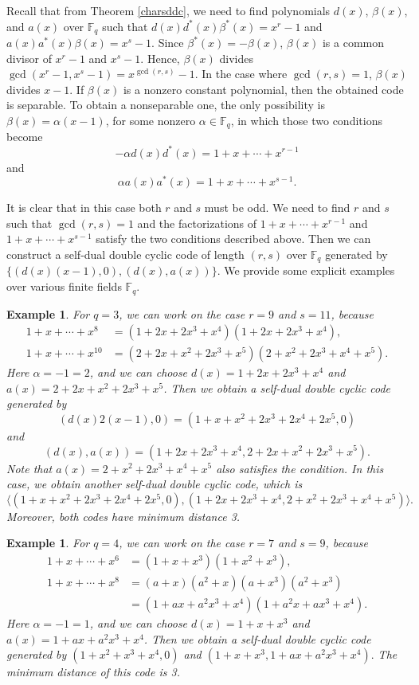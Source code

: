 \documentclass[12pt]{article}
\newtheorem{example}[theorem]{Example}
\begin{document}
	Recall that from Theorem \ref{charsddc}, we need to find polynomials $d(x)$, $\beta(x)$, and $a(x)$ over $\mathbb{F}_q$ such that $d(x)d^{*}(x)\beta^{*}(x)=x^r-1$ and $a(x)a^{*}(x)\beta(x)=x^s-1$. Since $\beta^{*}(x)=-\beta(x)$, $\beta(x)$ is a common divisor of $x^r-1$ and $x^s-1$. Hence, $\beta(x)$ divides $\gcd(x^r-1,x^s-1)=x^{\gcd(r,s)}-1$. In the case where $\gcd(r,s)=1$, $\beta(x)$ divides $x-1$. If $\beta(x)$ is a nonzero constant polynomial, then the obtained code is separable. To obtain a nonseparable one, the only possibility is $\beta(x)=\alpha(x-1)$, for some nonzero $\alpha\in\mathbb{F}_q$, in which those two conditions become
	$$-\alpha d(x)d^{*}(x)=1+x+\cdots+x^{r-1}$$
	and $$\alpha a(x)a^{*}(x)=1+x+\cdots+x^{s-1}.$$
	
	It is clear that in this case both $r$ and $s$ must be odd. We need to find $r$ and $s$ such that $\gcd(r,s)=1$ and the factorizations of $1+x+\cdots+x^{r-1}$ and $1+x+\cdots+x^{s-1}$ satisfy the two conditions described above. Then we can construct a self-dual double cyclic code of length $(r,s)$ over $\mathbb{F}_q$ generated by $\{(d(x)(x-1),0),(d(x),a(x))\}$. We provide some explicit examples over various finite fields $\mathbb{F}_q$.
	
	\begin{example}\label{ex3coprime}
		For $q=3$, we can work on the case $r=9$ and $s=11$, because
		\begin{align*}
			1+x+\cdots+x^8&=(1+2x+2x^3+x^4)(1+2x+2x^3+x^4),\\
			1+x+\cdots+x^{10}&=(2+2x+x^2+2x^3+x^5) (2+x^2+2x^3+x^4+x^5).
		\end{align*}
		Here $\alpha=-1=2$, and we can choose $d(x)=1+2x+2x^3+x^4$ and $a(x)=2+2x+x^2+2x^3+x^5$. Then we obtain a self-dual double cyclic code generated by $$(d(x)2(x-1),0)=(1+x+x^2+2x^3+2x^4+2x^5,0)$$ and $$(d(x),a(x))=(1+2x+2x^3+x^4,2+2x+x^2+2x^3+x^5).$$
		Note that $a(x)=2+x^2+2x^3+x^4+x^5$ also satisfies the condition. In this case, we obtain another self-dual double cyclic code, which is
		$$\langle (1+x+x^2+2x^3+2x^4+2x^5,0),(1+2x+2x^3+x^4,2+x^2+2x^3+x^4+x^5)\rangle.$$
		Moreover, both codes have minimum distance 3.
	\end{example}
	
	\begin{example}\label{ex4coprime}
		For $q=4$, we can work on the case $r=7$ and $s=9$, because
		\begin{align*}
			1+x+\cdots+x^6&=(1+x+x^3)(1+x^2+x^3),\\
			1+x+\cdots+x^8&=(a+x)(a^2+x)(a+x^3)(a^2+x^3)\\
			&=(1+a x+a^2 x^3+x^4)(1+a^2 x+a x^3+x^4).
		\end{align*}
		Here $\alpha=-1=1$, and we can choose $d(x)=1+x+x^3$ and $a(x)=1+a x+a^2 x^3+x^4$. Then we obtain a self-dual double cyclic code generated by $(1+x^2+x^3+x^4,0)$ and $(1+x+x^3,1+a x+a^2 x^3+x^4).$ The minimum distance of this code is 3.
	\end{example}
	
\end{document}
